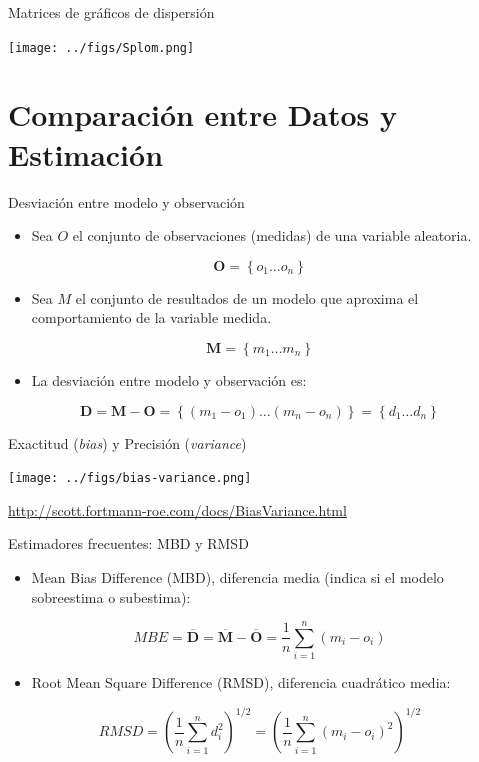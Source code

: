 \documentclass[aspectratio=169, usenames,svgnames,dvipsnames]{beamer}
\begin{document}
\begin{frame}[label={sec:org8a9c647}]{Matrices de gráficos de dispersión}
\begin{center}
\texttt{[image: ../figs/Splom.png]}
\end{center}
\end{frame}

\section{Comparación entre Datos y Estimación}
\label{sec:org31ab98b}

\begin{frame}[label={sec:orge43e3ae}]{Desviación entre modelo y observación}
\begin{itemize}
\item Sea \(O\) el conjunto de observaciones (medidas) de una variable aleatoria.
\end{itemize}

\[
\mathbf{O} = \left\{ o_1 \dots o_n \right\}
\]
\begin{itemize}
\item Sea \(M\) el conjunto de resultados de un modelo que aproxima el comportamiento de la variable medida.
\end{itemize}

\[
\mathbf{M} = \left\{ m_1 \dots m_n  \right\}
\]

\begin{itemize}
\item La desviación entre modelo y observación es:
\end{itemize}

\[
\mathbf{D} = \mathbf{M} - \mathbf{O} =  \left\{ (m_1 - o_1) \dots (m_n - o_n)  \right\} = \left\{ d_1 \dots d_n  \right\}
\]
\end{frame}

\begin{frame}[label={sec:org2c4d6d8}]{Exactitud (\emph{bias}) y Precisión (\emph{variance})}
\begin{center}
\texttt{[image: ../figs/bias-variance.png]}
\end{center}

\url{http://scott.fortmann-roe.com/docs/BiasVariance.html}
\end{frame}

\begin{frame}[label={sec:orga86c89b}]{Estimadores frecuentes: MBD y RMSD}
\begin{itemize}
\item Mean Bias Difference (MBD), diferencia media (indica si el modelo sobreestima o subestima):
\end{itemize}
\[
MBE = \overline{\mathbf{D}} = \overline{\mathbf{M}} - \overline{\mathbf{O}} = \frac{1}{n} \sum_{i=1}^n (m_i - o_i)
\]

\begin{itemize}
\item Root Mean Square Difference (RMSD), diferencia cuadrático media:
\end{itemize}
\[
RMSD = \left(\frac{1}{n} \sum_{i=1}^n d_i^2 \right)^{1/2} =  \left( \frac{1}{n} \sum_{i=1}^n (m_i - o_i)^2  \right)^{1/2}
\]
\end{frame}
\end{document}
